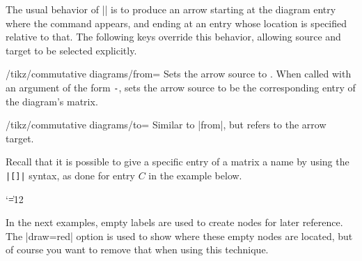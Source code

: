 \documentclass[a4paper]{ltxdoc}
\begin{document}
The usual behavior of |\arrow| is to produce an arrow starting at the
diagram entry where the command appears, and ending at an entry whose
location is specified relative to that.  The following keys override
this behavior, allowing source and target to be selected explicitly.

\begin{key}{/tikz/commutative diagrams/from=}
  Sets the arrow source to .  When called with an argument
  of the form \texttt{-}, sets
  the arrow source to be the corresponding entry of the diagram's
  matrix.
\end{key}

\begin{key}{/tikz/commutative diagrams/to=}
  Similar to |from|, but refers to the arrow target.
\end{key}

Recall that it is possible to give a specific entry of a \tikzname{}
matrix a name by using the \verb!|[!\verb!]|! syntax, as
done for entry $C$ in the example below.

{\catcode`\|=12
\begin{codeexample}[]
\end{codeexample}
}

In the next examples, empty labels are used to create nodes for later
reference.  The |draw=red| option is used to show where these empty
nodes are located, but of course you want to remove that when using
this technique.

\begin{codeexample}[]
\end{codeexample}

\begin{codeexample}[]
\end{codeexample}
\end{document}
